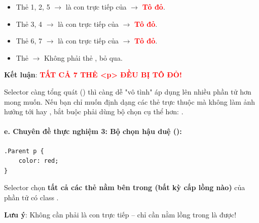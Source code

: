 \begin{noteBox}
\begin{itemize}[leftmargin=1.5em, itemsep=3pt, parsep=0pt]
    \item Thẻ  1, 2, 5 $\rightarrow$ là con trực tiếp của  $\rightarrow$ \textcolor{red}{\textbf{Tô đỏ}}.
    \item Thẻ  3, 4 $\rightarrow$ là con trực tiếp của  $\rightarrow$ \textcolor{red}{\textbf{Tô đỏ}}.
    \item Thẻ  6, 7 $\rightarrow$ là con trực tiếp của  $\rightarrow$ \textcolor{red}{\textbf{Tô đỏ}}.
    \item Thẻ  $\rightarrow$ Không phải thẻ , bỏ qua.
\end{itemize}
\textbf{Kết luận}: \textcolor{red}{\textbf{TẤT CẢ 7 THẺ <p> ĐỀU BỊ TÔ ĐỎ!}}
\end{noteBox}

\begin{warnBox}
Selector càng tổng quát () thì càng dễ "vô tình" áp dụng lên nhiều phần tử hơn mong muốn. Nếu bạn chỉ muốn định dạng các thẻ  trực thuộc  mà không làm ảnh hưởng tới  hay , bắt buộc phải dùng bộ chọn cụ thể hơn: .
\end{warnBox}

\paragraph{e. Chuyên đề thực nghiệm 3: Bộ chọn hậu duệ ():}

\begin{codeWindow}
\begin{lstlisting}[language=CSS3]
.Parent p {
    color: red;
}
\end{lstlisting}
\end{codeWindow}

\begin{conceptBox}
Selector  chọn \textbf{tất cả các thẻ  nằm bên trong (bất kỳ cấp lồng nào)} của phần tử có class .
\par\vspace{2pt}
\textbf{Lưu ý}: Không cần phải là con trực tiếp -- chỉ cần nằm lồng trong  là được!
\end{conceptBox}


